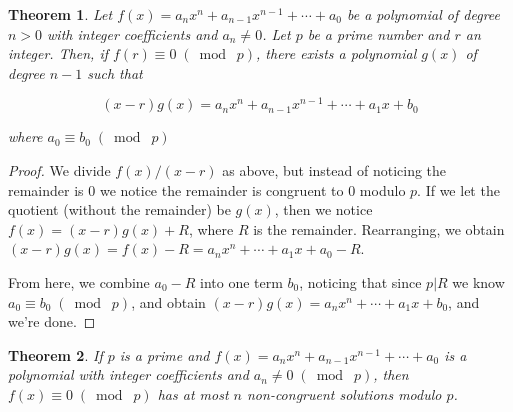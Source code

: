 \documentclass{article}
\newtheorem{thm}{Theorem}[section]
\numberwithin{equation}{thm}
\providecommand{\gmod}[1]{\; (\bmod \; #1)}
\begin{document}
\begin{thm} \label{6.2}
  Let $f(x) = a_n x^n + a_{n-1} x^{n-1} + \cdots + a_0$ be a polynomial of degree $n > 0$ with integer coefficients and $a_n \neq 0$. Let $p$ be a prime number and $r$ an integer. Then, if $f(r) \equiv 0 \gmod p$, there exists a polynomial $g(x)$ of degree $n-1$ such that

  $$(x-r)g(x) = a_nx^n + a_{n-1}x^{n-1} + \cdots + a_1x + b_0$$

  where $a_0 \equiv b_0 \gmod p$
\end{thm}

\begin{proof}
  We divide $f(x) / (x-r)$ as above, but instead of noticing the remainder is $0$ we notice the remainder is congruent to $0$ modulo $p$. If we let the quotient (without the remainder) be $g(x)$, then we notice $f(x) = (x-r) g(x) + R$, where $R$ is the remainder. Rearranging, we obtain $(x-r) g(x) = f(x) - R = a_n x^n + \cdots + a_1 x + a_0 - R$.

  From here, we combine $a_0 - R$ into one term $b_0$, noticing that since $p | R$ we know $a_0 \equiv b_0 \gmod p$, and obtain $(x-r) g(x) = a_n x^n + \cdots + a_1 x + b_0$, and we're done.
\end{proof}



\begin{thm} \label{6.3}
  If $p$ is a prime and $f(x) = a_n x^n + a_{n-1} x^{n-1} + \cdots + a_0$ is a polynomial with integer coefficients and $a_n \neq 0 \gmod p$, then $f(x) \equiv 0 \gmod p$ has at most $n$ non-congruent solutions modulo $p$.
\end{thm}
\end{document}
